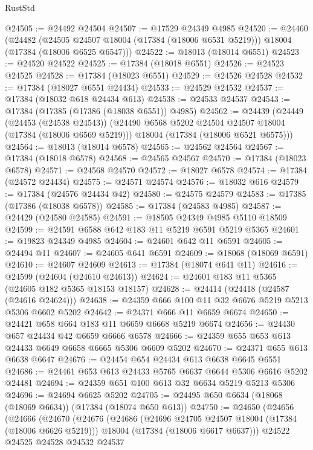 \begin{lexlean}{RustStd}
\begin{coremodule}
@24505 := @24492 @24504
@24507 := @17529 @24349 @4985
@24520 := @24460
    (@24482
      (@24505 @24507 @18004 (@17384 (@18006 @6531 @5219)))
      @18004
      (@17384 (@18006 @6525 @6547)))
@24522 := @18013 (@18014 @6551)
@24523 := @24520 @24522
@24525 := @17384 (@18018 @6551)
@24526 := @24523 @24525
@24528 := @17384 (@18023 @6551)
@24529 := @24526 @24528
@24532 := @17384 (@18027 @6551 @24434)
@24533 := @24529 @24532
@24537 := @17384 (@18032 @618 @24434 @613)
@24538 := @24533 @24537
@24543 := @17384 (@17385 (@17386 (@18038 @6551)) @4985)
@24562 := @24439
    (@24449
      (@24453 (@24538 @24543))
      (@24490 @6568 @5202 @24504 @24507 @18004 (@17384 (@18006 @6569 @5219)))
      @18004
      (@17384 (@18006 @6521 @6575)))
@24564 := @18013 (@18014 @6578)
@24565 := @24562 @24564
@24567 := @17384 (@18018 @6578)
@24568 := @24565 @24567
@24570 := @17384 (@18023 @6578)
@24571 := @24568 @24570
@24572 := @18027 @6578
@24574 := @17384 (@24572 @24434)
@24575 := @24571 @24574
@24576 := @18032 @616
@24579 := @17384 (@24576 @24434 @42)
@24580 := @24575 @24579
@24583 := @17385 (@17386 (@18038 @6578))
@24585 := @17384 (@24583 @4985)
@24587 := @24429 (@24580 @24585)
@24591 := @18505 @24349 @4985 @5110 @18509
@24599 := @24591 @6588 @642 @183 @11 @5219 @6591 @5219 @5365
@24601 := @19823 @24349 @4985
@24604 := @24601 @642 @11 @6591
@24605 := @24494 @11
@24607 := @24605 @641 @6591
@24609 := @18068 (@18069 @6591)
@24610 := @24607 @24609
@24613 := @17384 (@18074 @641 @11)
@24616 := @24599 (@24604 (@24610 @24613))
@24624 := @24601 @183 @11 @5365 (@24605 @182 @5365 @18153 @18157)
@24628 := @24414 (@24418 (@24587 (@24616 @24624)))
@24638 := @24359 @666 @100 @11 @32 @6676 @5219 @5213 @5306 @6602 @5202
@24642 := @24371 @666 @11 @6659 @6674
@24650 := @24421 @658 @664 @183 @11 @6659 @6668 @5219 @6674
@24656 := @24430 @657 @24434 @42 @6659 @6666 @6578
@24666 := @24359 @655 @653 @613 @24433 @6649 @6658 @6665 @5306 @6609 @5202
@24670 := @24371 @655 @613 @6638 @6647
@24676 := @24454 @654 @24434 @613 @6638 @6645 @6551
@24686 := @24461 @653 @613 @24433 @5765 @6637 @6644 @5306 @6616 @5202 @24481
@24694 := @24359 @651 @100 @613 @32 @6634 @5219 @5213 @5306
@24696 := @24694 @6625 @5202
@24705 := @24495 @650 @6634 (@18068 (@18069 @6634)) (@17384 (@18074 @650 @613))
@24750 := @24650
    (@24656
      (@24666
        (@24670
          (@24676
            (@24686
              (@24696 @24705 @24507 @18004 (@17384 (@18006 @6626 @5219)))
              @18004
              (@17384 (@18006 @6617 @6637)))
            @24522
            @24525
            @24528
            @24532
            @24537

\end{coremodule}
\end{lexlean}
